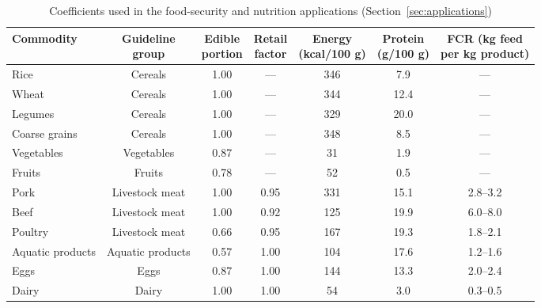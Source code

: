 \documentclass[preprint,12pt,authoryear]{elsarticle}
\begin{document}
\begin{table}[htbp]
\centering
\begin{threeparttable}
\caption{Coefficients used in the food-security and nutrition applications (Section~\ref{sec:applications})}
\label{tab:coefficients}
\footnotesize
\setlength{\tabcolsep}{0pt}
\begin{tabular*}{\textwidth}{@{\extracolsep{\fill}} l cccccc @{}}
\toprule
Commodity & \shortstack{Guideline\\group} & \shortstack{Edible\\portion} & \shortstack{Retail\\factor} & \shortstack{Energy\\(kcal/100 g)} & \shortstack{Protein\\(g/100 g)} & \shortstack{FCR (kg feed\\per kg product)} \\
\midrule
Rice             & Cereals          & 1.00 & --- & 346 & 7.9 & --- \\
Wheat            & Cereals          & 1.00 & --- & 344 & 12.4 & --- \\
Legumes          & Cereals          & 1.00 & --- & 329 & 20.0 & --- \\
Coarse grains    & Cereals          & 1.00 & --- & 348 & 8.5 & --- \\
Vegetables       & Vegetables       & 0.87 & --- & 31  & 1.9 & --- \\
Fruits           & Fruits           & 0.78 & --- & 52  & 0.5 & --- \\
Pork             & Livestock meat   & 1.00 & 0.95 & 331 & 15.1 & 2.8--3.2 \\
Beef             & Livestock meat   & 1.00 & 0.92 & 125 & 19.9 & 6.0--8.0 \\
Poultry          & Livestock meat   & 0.66 & 0.95 & 167 & 19.3 & 1.8--2.1 \\
Aquatic products & Aquatic products & 0.57 & 1.00 & 104 & 17.6 & 1.2--1.6 \\
Eggs             & Eggs             & 0.87 & 1.00 & 144 & 13.3 & 2.0--2.4 \\
Dairy            & Dairy            & 1.00 & 1.00 & 54  & 3.0  & 0.3--0.5 \\
\bottomrule
\end{tabular*}
\begin{tablenotes}[flushleft]
\scriptsize

\end{tablenotes}
\end{threeparttable}
\end{table}
\end{document}
